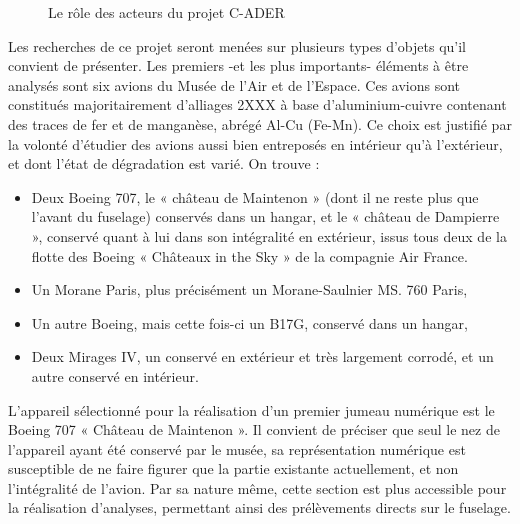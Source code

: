 \clearpage %

\begin{figure}[H]
    \centering
    \caption{Le rôle des acteurs du projet C-ADER}
\end{figure}


    
Les recherches de ce projet seront menées sur plusieurs types d'objets qu’il convient de présenter. Les premiers -et les plus importants- éléments à être analysés sont six avions du Musée de l’Air et de l’Espace. Ces avions sont constitués majoritairement d’alliages 2XXX à base d’aluminium-cuivre contenant des traces de fer et de manganèse, abrégé Al-Cu (Fe-Mn). Ce choix est justifié par la volonté d'étudier des avions aussi bien entreposés en intérieur qu’à l’extérieur, et dont l'état de dégradation est varié. On trouve : 

\begin{itemize}
    \item Deux Boeing 707, le « château de Maintenon » (dont il ne reste plus que l’avant du fuselage) conservés dans un hangar, et le « château de Dampierre », conservé quant à lui dans son intégralité en extérieur, issus tous deux de la flotte des Boeing « Châteaux in the Sky » de la compagnie Air France.
    \item Un Morane Paris, plus précisément un Morane-Saulnier MS. 760 Paris,
    \item Un autre Boeing, mais cette fois-ci un B17G, conservé dans un hangar,
    \item Deux Mirages IV, un conservé en extérieur et très largement corrodé, et un autre conservé en intérieur.
\end{itemize}

L’appareil sélectionné pour la réalisation d’un premier jumeau numérique est le Boeing 707 « Château de Maintenon ». Il convient de préciser que seul le nez de l’appareil ayant été conservé par le musée, sa représentation numérique est susceptible de ne faire figurer que la partie existante actuellement, et non l’intégralité de l’avion. Par sa nature même, cette section est plus accessible pour la réalisation d’analyses, permettant ainsi des prélèvements directs sur le fuselage.\\


